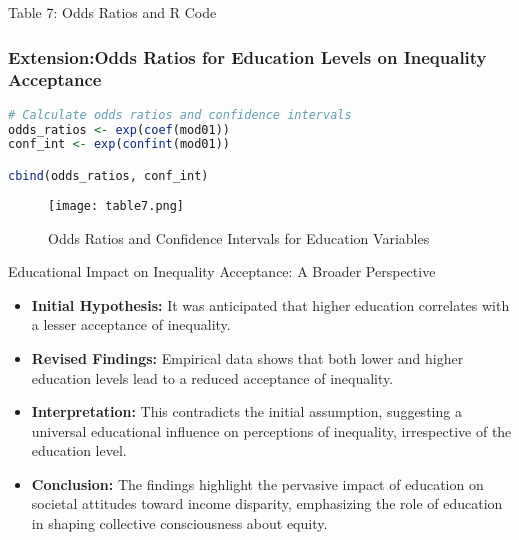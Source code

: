 \documentclass[aspectratio=169,10pt,compress]{beamer}
\begin{document}
\begin{frame}[fragile]{Table 7: Odds Ratios and R Code}
  \frametitle{Extension:Odds Ratios for Education Levels on Inequality Acceptance}

  \begin{lstlisting}[language=R]
# Calculate odds ratios and confidence intervals
odds_ratios <- exp(coef(mod01))
conf_int <- exp(confint(mod01))

cbind(odds_ratios, conf_int)
  \end{lstlisting}

  \begin{figure}
  \centering
  \texttt{[image: table7.png]} %
  \caption{Odds Ratios and Confidence Intervals for Education Variables}
\end{figure}
\end{frame}


\begin{frame}{Educational Impact on Inequality Acceptance: A Broader Perspective}
  \begin{itemize}
    \item \textbf{Initial Hypothesis:} It was anticipated that higher education correlates with a lesser acceptance of inequality.
    
    \item \textbf{Revised Findings:} Empirical data shows that both lower and higher education levels lead to a reduced acceptance of inequality.
    
    \item \textbf{Interpretation:} This contradicts the initial assumption, suggesting a universal educational influence on perceptions of inequality, irrespective of the education level.
    
    \item \textbf{Conclusion:} The findings highlight the pervasive impact of education on societal attitudes toward income disparity, emphasizing the role of education in shaping collective consciousness about equity.
  \end{itemize}
\end{frame}
\end{document}
